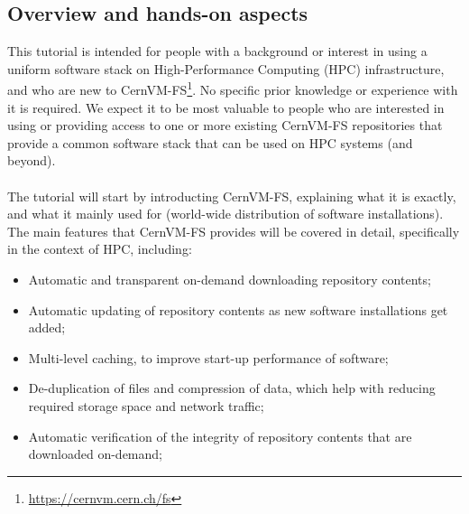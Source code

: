 

\subsection*{Overview and hands-on aspects}

This tutorial is intended for people with a background or interest in using a uniform software stack on
High-Performance Computing (HPC) infrastructure, %
and who are new to CernVM-FS\footnote{\href{https://cernvm.cern.ch/fs}{https://cernvm.cern.ch/fs}}.
No specific prior knowledge or experience with it is required.
We expect it to be most valuable to people who are interested in using or providing access to one or more existing
CernVM-FS repositories that provide a common software stack that can be used on HPC systems (and beyond).

\paragraph{} 
The tutorial will start by introducting CernVM-FS, explaining what it is exactly, and what it mainly used for
(world-wide distribution of software installations). The main features that CernVM-FS provides will be covered in detail,
specifically in the context of HPC, including:
\begin{itemize}
\item Automatic and transparent on-demand downloading repository contents;
\item Automatic updating of repository contents as new software installations get added;
\item Multi-level caching, to improve start-up performance of software;
\item De-duplication of files and compression of data, which help with reducing required storage space and network traffic;
\item Automatic verification of the integrity of repository contents that are downloaded on-demand;
\end{itemize}

